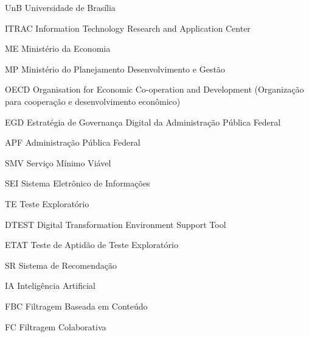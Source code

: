 \begin{siglas}

    \item[UnB] Universidade de Brasília
    \item[ITRAC] Information Technology Research and Application Center
    \item[ME] Ministério da Economia
    \item[MP] Ministério do Planejamento Desenvolvimento e Gestão
    \item[OECD] Organisation for Economic Co-operation and Development (Organização
  para cooperação e desenvolvimento econômico)
    \item[EGD] Estratégia de Governança Digital da Administração Pública Federal
    \item[APF] Administração Pública Federal
    \item[SMV] Serviço Mínimo Viável
    \item[SEI] Sistema Eletrônico de Informações
    \item[TE] Teste Exploratório
    \item[DTEST] Digital Transformation Environment Support Tool
    \item[ETAT] Teste de Aptidão de Teste Exploratório
    \item[SR] Sistema de Recomendação
    \item[IA] Inteligência Artificial
    \item[FBC] Filtragem Baseada em Conteúdo
    \item[FC] Filtragem Colaborativa
\end{siglas}

